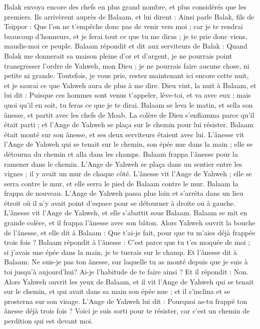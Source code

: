 \begin{multicols}{2}
Balak envoya encore des chefs en plus grand nombre, et plus considérés que les premiers.
Ils arrivèrent auprès de Balaam, et lui dirent : Ainsi parle Balak, fils de Tsippor : Que l’on ne t’empêche donc pas de venir vers moi ;
car je te rendrai beaucoup d’honneurs, et je ferai tout ce que tu me diras ; je te prie donc viens, maudis-moi ce peuple.
Balaam répondit et dit aux serviteurs de Balak : Quand Balak me donnerait sa maison pleine d'or et d'argent, je ne pourrais point transgresser l’ordre de Yahweh, mon Dieu ; je ne pourrais faire aucune chose, ni petite ni grande.
Toutefois, je vous prie, restez maintenant ici encore cette nuit, et je saurai ce que Yahweh aura de plus à me dire.
Dieu vint, la nuit à Balaam, et lui dit : Puisque ces hommes sont venus t'appeler, lève-toi, et va avec eux ; mais quoi qu'il en soit, tu feras ce que je te dirai.
Balaam se leva le matin, et sella son ânesse, et partit avec les chefs de Moab.
La colère de Dieu s'enflamma parce qu'il était parti ; et l'Ange de Yahweh se plaça sur le chemin pour lui résister. Balaam était monté sur son ânesse, et ses deux serviteurs étaient avec lui.
L'ânesse vit l'Ange de Yahweh qui se tenait sur le chemin, son épée nue dans la main ; elle se détourna du chemin et alla dans les champs. Balaam frappa l'ânesse pour la ramener dans le chemin.
L’Ange de Yahweh se plaça dans un sentier entre les vignes ; il y avait un mur de chaque côté.
L'ânesse vit l'Ange de Yahweh ; elle se serra contre le mur, et elle serra le pied de Balaam contre le mur. Balaam la frappa de nouveau.
L'Ange de Yahweh passa plus loin et s'arrêta dans un lieu étroit où il n'y avait point d’espace pour se détourner à droite ou à gauche.
L'ânesse vit l'Ange de Yahweh, et elle s’abattit sous Balaam. Balaam se mit en grande colère, et il frappa l'ânesse avec son bâton.
Alors Yahweh ouvrit la bouche de l'ânesse, et elle dit à Balaam : Que t'ai-je fait, pour que tu m'aies déjà frappée trois fois ?
Balaam répondit à l'ânesse : C’est parce que tu t'es moquée de moi ; si j’avais une épée dans la main, je te tuerais sur le champ.
Et l'ânesse dit à Balaam: Ne suis-je pas ton ânesse, sur laquelle tu as monté depuis que je suis à toi jusqu'à aujourd'hui? Ai-je l’habitude de te faire ainsi ? Et il répondit : Non.
Alors Yahweh ouvrit les yeux de Balaam, et il vit l'Ange de Yahweh qui se tenait sur le chemin, et qui avait dans sa main son épée nue ; et il s'inclina et se prosterna sur son visage.
L'Ange de Yahweh lui dit : Pourquoi as-tu frappé ton ânesse déjà trois fois ? Voici je suis sorti pour te résister, car c’est un chemin de perdition qui est devant moi.

\end{multicols}
